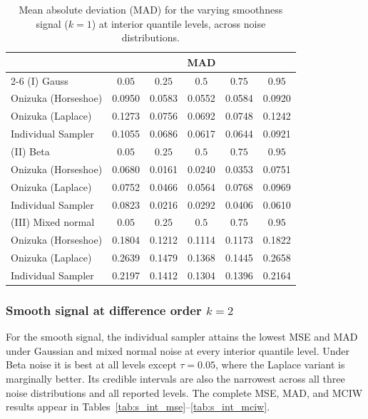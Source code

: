 \begin{table}[htbp]
\centering
\caption{Mean absolute deviation (MAD) for the varying smoothness signal ($k=1$) at interior quantile levels, across noise distributions.}
\label{tab:vs_int_mad}
\begin{tabular}{lccccc}
\toprule
& \multicolumn{5}{c}{MAD} \\
\cmidrule(lr){2-6}
(I) Gauss & $0.05$ & $0.25$ & $0.5$ & $0.75$ & $0.95$ \\
\midrule
Onizuka (Horseshoe) & 0.0950 & 0.0583 & 0.0552 & 0.0584 & 0.0920 \\
Onizuka (Laplace)   & 0.1273 & 0.0756 & 0.0692 & 0.0748 & 0.1242 \\
Individual Sampler  & 0.1055 & 0.0686 & 0.0617 & 0.0644 & 0.0921 \\
\midrule
(II) Beta & $0.05$ & $0.25$ & $0.5$ & $0.75$ & $0.95$ \\
\midrule
Onizuka (Horseshoe) & 0.0680 & 0.0161 & 0.0240 & 0.0353 & 0.0751 \\
Onizuka (Laplace)   & 0.0752 & 0.0466 & 0.0564 & 0.0768 & 0.0969 \\
Individual Sampler  & 0.0823 & 0.0216 & 0.0292 & 0.0406 & 0.0610 \\
\midrule
(III) Mixed normal & $0.05$ & $0.25$ & $0.5$ & $0.75$ & $0.95$ \\
\midrule
Onizuka (Horseshoe) & 0.1804 & 0.1212 & 0.1114 & 0.1173 & 0.1822 \\
Onizuka (Laplace)   & 0.2639 & 0.1479 & 0.1368 & 0.1445 & 0.2658 \\
Individual Sampler  & 0.2197 & 0.1412 & 0.1304 & 0.1396 & 0.2164 \\
\bottomrule
\end{tabular}
\end{table}

\subsubsection{Smooth signal at difference order \texorpdfstring{$k=2$}{k=2}}
\label{app:sim:individual:smooth}

For the smooth signal, the individual sampler attains the lowest MSE and MAD under Gaussian and mixed normal noise at every interior quantile level. Under Beta noise it is best at all levels except $\tau=0.05$, where the Laplace variant is marginally better. Its credible intervals are also the narrowest across all three noise distributions and all reported levels. The complete MSE, MAD, and MCIW results appear in Tables~\ref{tab:s_int_mse}--\ref{tab:s_int_mciw}.

